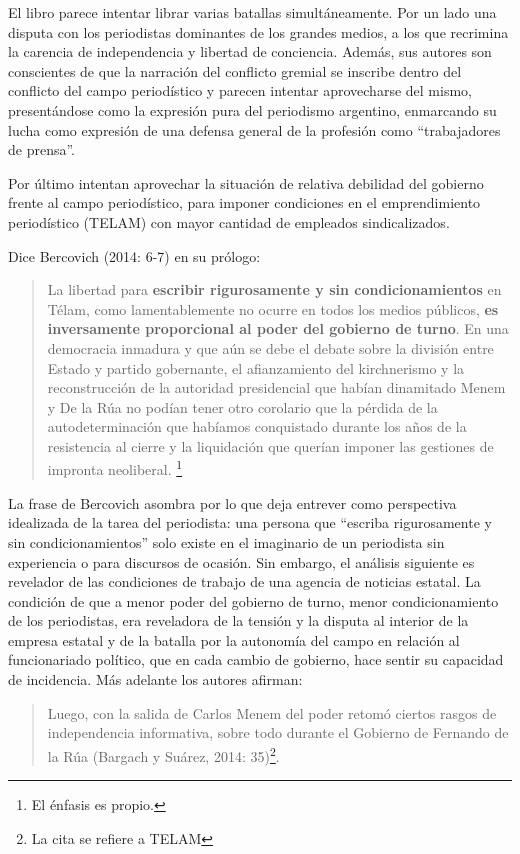 El libro parece intentar librar varias batallas simultáneamente. Por un lado una disputa con los periodistas dominantes de los grandes medios, a los que recrimina la carencia de independencia y libertad de conciencia. Además, sus autores son conscientes de que la narración del conflicto gremial se inscribe dentro del conflicto del campo periodístico y parecen intentar aprovecharse del mismo, presentándose como la expresión pura del periodismo argentino, enmarcando su lucha como expresión de una defensa general de la profesión como ``trabajadores de prensa''.

Por último intentan aprovechar la situación de relativa debilidad del gobierno frente al campo periodístico, para imponer condiciones en el emprendimiento periodístico (TELAM) con mayor cantidad de empleados sindicalizados.

Dice Bercovich (2014: 6-7) en su prólogo:

\begin{quote}
La libertad para \textbf{escribir rigurosamente y sin condicionamientos} en Télam, como lamentablemente no ocurre en todos los medios públicos, \textbf{es inversamente proporcional al poder del gobierno de turno}. En una democracia inmadura y que aún se debe el debate sobre la división entre Estado y partido gobernante, el afianzamiento del kirchnerismo y la reconstrucción de la autoridad presidencial que habían dinamitado Menem y De la Rúa no podían tener otro corolario que la pérdida de la autodeterminación que habíamos conquistado durante los años de la resistencia al cierre y la liquidación que querían imponer las gestiones de impronta neoliberal. \footnote{El énfasis es propio.}
\end{quote}

La frase de Bercovich asombra por lo que deja entrever como perspectiva idealizada de la tarea del periodista: una persona que ``escriba rigurosamente y sin condicionamientos'' solo existe en el imaginario de un periodista sin experiencia o para discursos de ocasión. Sin embargo, el análisis siguiente es revelador de las condiciones de trabajo de una agencia de noticias estatal. La condición de que a menor poder del gobierno de turno, menor condicionamiento de los periodistas, era reveladora de la tensión y la disputa al interior de la empresa estatal y de la batalla por la autonomía del campo en relación al funcionariado político, que en cada cambio de gobierno, hace sentir su capacidad de incidencia. Más adelante los autores afirman:

\begin{quote}
Luego, con la salida de Carlos Menem del poder retomó ciertos rasgos de independencia informativa, sobre todo durante el Gobierno de Fernando de la Rúa (Bargach y Suárez, 2014: 35)\footnote{La cita se refiere a TELAM}.
\end{quote}


